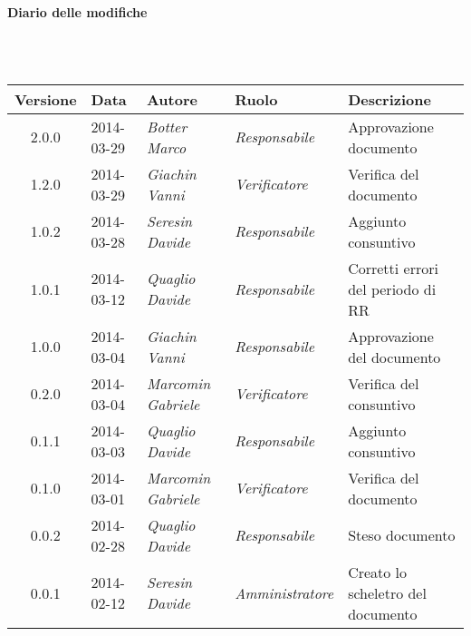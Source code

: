 \noindent\begin{Large}\textbf{Diario delle modifiche}\end{Large}\\
\\
\begin{small}
\begin{tabular}{|c|p{1.8cm}|p{2.8cm}|p{2.8cm}|p{3.5cm}|}
\hline
Versione & Data & Autore & Ruolo & Descrizione \\
\hline
\hline
2.0.0 & 2014-03-29 & 
\textit{Botter Marco} &
\textit{Responsabile} &  Approvazione documento\\
\hline
1.2.0 & 2014-03-29 & 
\textit{Giachin Vanni} &
\textit{Verificatore} &  Verifica del documento\\
\hline
\hline
1.0.2 & 2014-03-28 & 
\textit{Seresin Davide} &
\textit{Responsabile} &  Aggiunto consuntivo\\
\hline
1.0.1 & 2014-03-12 & 
\textit{Quaglio Davide} &
\textit{Responsabile} &  Corretti errori del periodo di RR\\
\hline
1.0.0 & 2014-03-04 & 
\textit{Giachin Vanni} &
\textit{Responsabile} &  Approvazione del documento\\
\hline
0.2.0 & 2014-03-04 & 
\textit{Marcomin Gabriele} &
\textit{Verificatore} &  Verifica del consuntivo\\
\hline
0.1.1 & 2014-03-03 & 
\textit{Quaglio Davide} &
\textit{Responsabile} &  Aggiunto consuntivo\\
\hline
0.1.0 & 2014-03-01 & 
\textit{Marcomin Gabriele} &
\textit{Verificatore} &  Verifica del documento \\
\hline
0.0.2 & 2014-02-28 & 
\textit{Quaglio Davide} &
\textit{Responsabile} &  Steso documento\\
\hline
0.0.1 & 2014-02-12 & 
\textit{Seresin Davide} &
\textit{Amministratore} &  Creato lo scheletro del documento\\
\hline
\end{tabular}\\
\end{small}